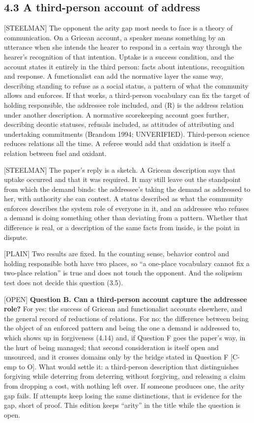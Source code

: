 \documentclass[11pt]{article}
\newcommand{\register}[1]{{\ttfamily\small #1}}
\begin{document}
\subsection*{4.3 A third-person account of address}

\register{[STEELMAN]} The opponent the arity gap most needs to face is a theory of communication. On a Gricean account, a speaker means something by an utterance when she intends the hearer to respond in a certain way through the hearer's recognition of that intention. Uptake is a success condition, and the account states it entirely in the third person: facts about intentions, recognition and response. A functionalist can add the normative layer the same way, describing standing to refuse as a social status, a pattern of what the community allows and enforces. If that works, a third-person vocabulary can fix the target of holding responsible, the addressee role included, and (R) is the address relation under another description. A normative scorekeeping account goes further, describing deontic statuses, refusals included, as attitudes of attributing and undertaking commitments (Brandom 1994; UNVERIFIED). Third-person science reduces relations all the time. A referee would add that oxidation is itself a relation between fuel and oxidant.

\register{[STEELMAN]} The paper's reply is a sketch. A Gricean description says that uptake occurred and that it was required. It may still leave out the standpoint from which the demand binds: the addressee's taking the demand as addressed to her, with authority she can contest. A status described as what the community enforces describes the system role of everyone in it, and an addressee who refuses a demand is doing something other than deviating from a pattern. Whether that difference is real, or a description of the same facts from inside, is the point in dispute.

\register{[PLAIN]} Two results are fixed. In the counting sense, behavior control and holding responsible both have two places, so ``a one-place vocabulary cannot fix a two-place relation'' is true and does not touch the opponent. And the solipsism test does not decide this question (3.5).

\register{[OPEN]} \textbf{Question B. Can a third-person account capture the addressee role?} For yes: the success of Gricean and functionalist accounts elsewhere, and the general record of reductions of relations. For no: the difference between being the object of an enforced pattern and being the one a demand is addressed to, which shows up in forgiveness (4.14) and, if Question F goes the paper's way, in the hurt of being managed; that second consideration is itself open and unsourced, and it crosses domains only by the bridge stated in Question F [C-emp to O]. What would settle it: a third-person description that distinguishes forgiving while deterring from deterring without forgiving, and releasing a claim from dropping a cost, with nothing left over. If someone produces one, the arity gap fails. If attempts keep losing the same distinctions, that is evidence for the gap, short of proof. This edition keeps ``arity'' in the title while the question is open.
\end{document}
